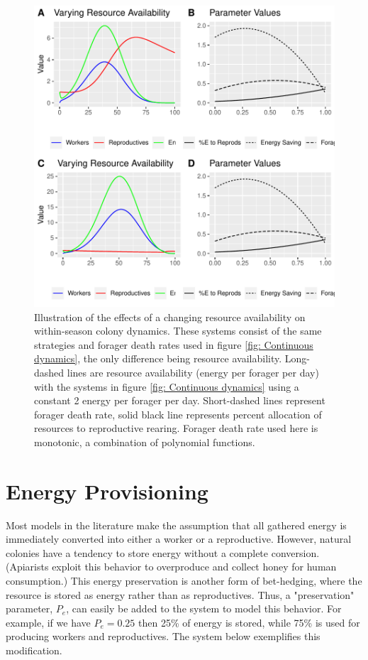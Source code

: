 \documentclass[12pt]{report}
\begin{document}
\begin{figure}[t!]
\centering
\includegraphics{SweaveDoc-007}
\caption{Illustration of the effects of a changing resource availability on within-season colony dynamics. These systems consist of the same strategies and forager death rates used in figure \ref{fig: Continuous dynamics}, the only difference being resource availability. Long-dashed lines are resource availability (energy per forager per day) with the systems in figure \ref{fig: Continuous dynamics} using a constant 2 energy per forager per day. Short-dashed lines represent forager death rate, solid black line represents percent allocation of resources to reproductive rearing. Forager death rate used here is monotonic, a combination of polynomial functions.}
\label{fig: Continuous dynamics 2}
\end{figure}

\section*{Energy Provisioning}
Most models in the literature make the assumption that all gathered energy is immediately converted into either a worker or a reproductive. However, natural colonies have a tendency to store energy without a complete conversion. (Apiarists exploit this behavior to overproduce and collect honey for human consumption.) This energy preservation is another form of bet-hedging, where the resource is stored as energy rather than as reproductives. Thus, a "preservation" parameter, $P_e$, can easily be added to the system to model this behavior. For example, if we have $P_e=0.25$ then 25\% of energy is stored, while 75\% is used for producing workers and reproductives. The system below exemplifies this modification.
\end{document}
